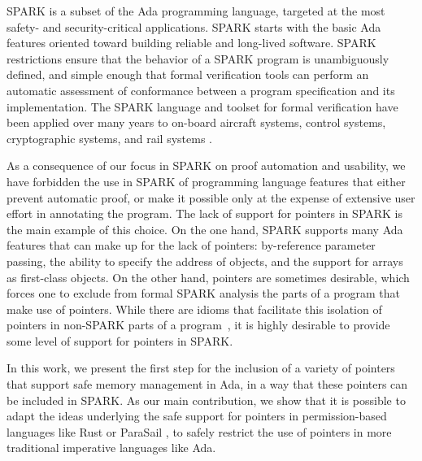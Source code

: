 \documentclass{llncs}
\begin{document}
SPARK is a subset of the Ada programming language, targeted at the most safety- and security-critical applications. SPARK starts with the basic Ada features oriented toward building reliable and long-lived software. SPARK restrictions ensure that the behavior of a SPARK program is unambiguously defined, and simple enough that formal verification tools can perform an automatic assessment of conformance between a program specification and its implementation. The SPARK language and toolset for formal verification have been applied over many years to on-board aircraft systems,
control systems, cryptographic systems, and rail systems \cite{ONeill2012, McCormick2015}.

As a consequence of our focus in SPARK on proof automation and usability, we have forbidden the use in SPARK of programming language features that either prevent automatic proof, or make it possible only at the expense of extensive user effort in annotating the program. The lack of support for pointers in SPARK is the main example of this choice. On the one hand, SPARK supports many Ada features that can make up for the lack of pointers: by-reference parameter passing, the ability to specify the address of objects, and the support for arrays as first-class objects. On the other hand, pointers are sometimes desirable, which forces one to exclude from formal SPARK analysis the parts of a program that make use of pointers. While there are idioms that facilitate this isolation of pointers in non-SPARK parts of a program~\cite{AdaCoreThalesSPARK}, it is highly desirable to provide some level of support for pointers in SPARK.

In this work, we present the first step for the inclusion of a variety of pointers that support safe memory management in Ada, in a way that these pointers can be included in SPARK. As our main contribution, we show that it is possible to adapt the ideas underlying the safe support for pointers in permission-based languages like Rust \cite{Balasubramanian17} or ParaSail , to safely restrict the use of pointers in more traditional imperative languages like Ada. 
\end{document}
